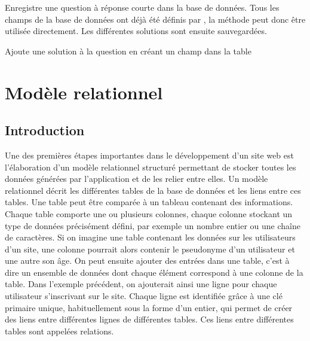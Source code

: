 \documentclass[a4,10pt,french]{sphinxmanual}
\begin{document}
\begin{fulllineitems}
\label{source:quiz.utils.save.SaveSimpleQuestion}
Enregistre une question à réponse courte dans la base de données. Tous les champs
de la base de données ont déjà été définis par {\hyperref[source:quiz.utils.save.SaveQuestion]{\emph{}}},
la méthode  peut donc être utilisée directement. Les différentes
solutions sont ensuite sauvegardées.

\begin{fulllineitems}
\label{source:quiz.utils.save.SaveSimpleQuestion.add_answer}
Ajoute une solution à la question en créant un champ dans la table 

\end{fulllineitems}


\end{fulllineitems}



\chapter{Modèle relationnel}
\label{database:modele-relationnel}\label{database::doc}

\section{Introduction}
\label{database:introduction}
Une des premières étapes importantes dans le développement d'un site web est l'élaboration d'un modèle relationnel structuré permettant de stocker toutes les données générées par l'application et de les relier entre elles. Un modèle relationnel décrit les différentes tables de la base de données et les liens entre ces tables. Une table peut être comparée à un tableau contenant des informations. Chaque table comporte une ou plusieurs colonnes, chaque colonne stockant un type de données précisément défini, par exemple un nombre entier ou une chaîne de caractères. Si on imagine une table contenant les données sur les utilisateurs d'un site, une colonne pourrait alors contenir le pseudonyme d'un utilisateur et une autre son âge. On peut ensuite ajouter des entrées dans une table, c'est à dire un ensemble de données dont chaque élément correspond à une colonne de la table. Dans l'exemple précédent, on ajouterait ainsi une ligne pour chaque utilisateur s'inscrivant sur le site. Chaque ligne est identifiée grâce à une clé primaire unique, habituellement sous la forme d'un entier, qui permet de créer des liens entre différentes lignes de différentes tables. Ces liens entre différentes tables sont appelées relations.
\end{document}
